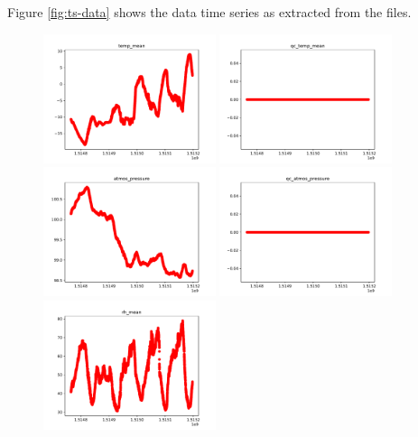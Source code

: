 \documentclass[11pt]{amsart}
\begin{document}
Figure \ref{fig:ts-data} shows the data time series as extracted from the files.
\begin{figure}
    \includegraphics[width=0.45\textwidth]{../plots/temp_mean.pdf}
    \includegraphics[width=0.45\textwidth]{../plots/qc_temp_mean.pdf}
    \includegraphics[width=0.45\textwidth]{../plots/atmos_pressure.pdf}
    \includegraphics[width=0.45\textwidth]{../plots/qc_atmos_pressure.pdf}
    \includegraphics[width=0.45\textwidth]{../plots/rh_mean.pdf}

\end{figure}
\end{document}
